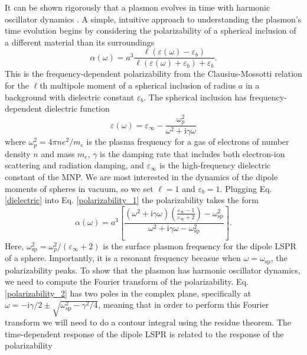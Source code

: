 \documentclass [11pt, proquest] {uwthesis}[2016/11/22]
\begin{document}
It can be shown rigorously that a plasmon evolves in time with harmonic oscillator dynamics \cite{KREIBIG1985,ARPC}. A simple, intuitive approach to understanding the plasmon's time evolution begins by considering the polarizability of a spherical inclusion of a different material than its surroundings
\begin{equation}
\alpha(\omega) = a^3\frac{\ell(\varepsilon(\omega)-\varepsilon_b)}{\ell(\varepsilon(\omega)+\varepsilon_b)+\varepsilon_b}.
\label{polarizability_1}
\end{equation}
This is the frequency-dependent polarizability from the Clausius-Mossotti relation \cite{Clausius} for the $\ell$th multipole moment of a spherical inclusion of radius $a$ in a background with dielectric constant $\varepsilon_b$.  The spherical inclusion has frequency-dependent dielectric function 
\begin{equation}
\varepsilon(\omega) = \varepsilon_{\infty} - \frac{\omega_p^2}{\omega^2+\textrm{i}\gamma\omega}
\label{dielectric}
\end{equation}
where $\omega_p^2 = 4\pi ne^2/m_e$ is the plasma frequency for a gas of electrons of number density $n$ and mass $m_e$, $\gamma$ is the damping rate that includes both electron-ion scattering and radiation damping, and $\varepsilon_{\infty}$ is the high-frequency dielectric constant of the MNP. We are most interested in the dynamics of the dipole moments of spheres in vacuum, so we set $\ell = 1$ and $\varepsilon_b = 1$. Plugging Eq. \ref{dielectric} into Eq. \ref{polarizability_1} the polarizability takes the form
\begin{equation}
\alpha(\omega) = a^3\left[\frac{\left(\omega^2+\textrm{i}\gamma\omega\right)\left(\frac{\varepsilon_{\infty}-1}{\varepsilon_{\infty}+2}\right)-\omega_{\textrm{sp}}^2}{\omega^2+\textrm{i}\gamma\omega-\omega_{\textrm{sp}}^2}\right].
\label{polarizability_2}
\end{equation}
Here, $\omega_{\textrm{sp}}^2 = \omega_p^2/(\varepsilon_{\infty}+2)$ is the surface plasmon frequency for the dipole LSPR of a sphere. Importantly, it is a resonant frequency becasue when $\omega=\omega_{\textrm{sp}}$, the polarizability peaks. To show that the plasmon has harmonic oscillator dynamics, we need to compute the Fourier transform of the polarizability. Eq. \ref{polarizability_2} has two poles in the complex plane, specifically at $\omega = -\textrm{i}\gamma/2 \pm \sqrt{\omega_\textrm{sp}^2-\gamma^2/4}$, meaning that in order to perform this Fourier transform we will need to do a contour integral using the residue theorem. The time-dependent response of the dipole LSPR is related to the response of the polarizability \cite{ARPC,Quillin}
\end{document}
